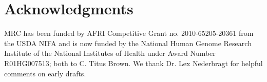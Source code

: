 \documentclass[12pt]{article}
\begin{document}




\section*{Acknowledgments}

MRC has been funded by AFRI Competitive Grant no. 2010-65205-20361
from the USDA NIFA and is now funded by the National Human Genome
Research Institute of the National Institutes of Health under Award
Number R01HG007513; both to C. Titus Brown.  We thank Dr. Lex
Nederbragt for helpful comments on early drafts.








\end{document}
